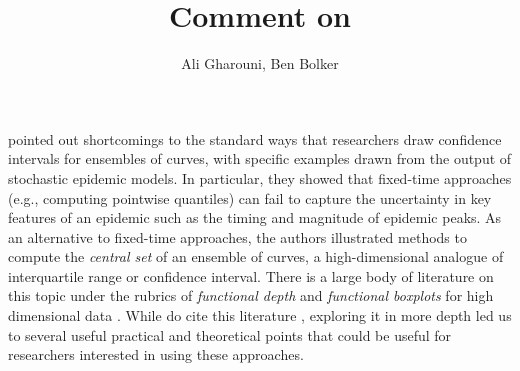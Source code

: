 \documentclass[12pt]{article}
\title{Comment on \cite{juul2021fixed}}
\author{Ali Gharouni, Ben Bolker}
\newcommand{\comment}{\showcomment}
\newcommand{\showcomment}[3]{\textcolor{#1}{\textbf{[#2: }\textsl{#3}\textbf{]}}}
\newcommand{\bmb}[1]{\comment{red}{BMB}{#1}}
\theoremstyle{definition} %
\begin{document}
\maketitle
\linenumbers



\cite{juul2021fixed} pointed out shortcomings to the standard ways that researchers draw confidence intervals for ensembles of curves, with specific examples drawn from the output of stochastic epidemic models. In particular, they showed that fixed-time approaches (e.g., computing pointwise quantiles) can fail to capture the uncertainty in key features of an epidemic such as the timing and magnitude of epidemic peaks.  As an alternative to fixed-time approaches, the authors illustrated methods to compute the \emph{central set} of an ensemble of curves, a high-dimensional analogue of interquartile range or confidence interval. There is a large body of literature on this topic under the rubrics of \emph{functional depth} and \emph{functional boxplots} for high dimensional data \citep{fraiman2001trimmed, lopez2007depth, lopez2009concept, sun2011functional,sun2012exact}. While \cite{juul2021fixed} do cite this literature \citep{sun2011functional}, exploring it in more depth led us to several useful practical and theoretical points that could be useful for researchers interested in using these approaches.
\end{document}
